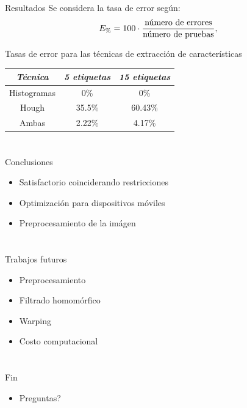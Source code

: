 \documentclass[spanish]{beamer}
\begin{document}
\section[Resultados]{}
\begin{frame}{Resultados}
  Se considera la tasa de error según:
  \begin{equation*}
    E_{\%}=100\cdot\frac{\textrm{número de errores}}{\textrm{número de pruebas}},
  \end{equation*}


  Tasas de error para las técnicas de extracción de características
  \begin{center}\begin{tabular}{ccc}
      \hline \emph{{Técnica}} & \emph{5 etiquetas} & \emph{15 etiquetas}\\
      \hline Histogramas & 0\% & 0\%\\
      \hline Hough & 35.5\% & 60.43\%\\
      \hline Ambas & 2.22\% & 4.17\%\\
      \hline
  \end{tabular}\end{center}
  \label{tablaerrores}


\end{frame}


\section[Conclusiones]{}

\begin{frame}{Conclusiones}
  \begin{itemize}
  \item Satisfactorio coinciderando restricciones
  \item Optimización para dispositivos móviles
  \item Preprocesamiento de la imágen
  \end{itemize}
\end{frame}

\section[Trabajos futuros]{}

\begin{frame}{Trabajos futuros}
  \begin{itemize}
  \item Preprocesamiento
  \item Filtrado homomórfico
  \item Warping
  \item Costo computacional
  \end{itemize}
\end{frame}
\section[Fin]{}

\begin{frame}{Fin}
  \begin{itemize}
  \item Preguntas?
  \end{itemize}
\end{frame}
\end{document}
